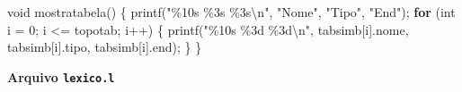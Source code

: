 \documentclass[
  brazilian,
  letterpaper,
]{book}
\newenvironment{Shaded}{\begin{snugshade}}{\end{snugshade}}
\newcommand{\ControlFlowTok}[1]{\textcolor[rgb]{0.00,0.23,0.31}{\textbf{#1}}}
\newcommand{\DataTypeTok}[1]{\textcolor[rgb]{0.68,0.00,0.00}{#1}}
\newcommand{\DecValTok}[1]{\textcolor[rgb]{0.68,0.00,0.00}{#1}}
\newcommand{\NormalTok}[1]{\textcolor[rgb]{0.00,0.23,0.31}{#1}}
\newcommand{\OperatorTok}[1]{\textcolor[rgb]{0.37,0.37,0.37}{#1}}
\newcommand{\SpecialCharTok}[1]{\textcolor[rgb]{0.37,0.37,0.37}{#1}}
\newcommand{\StringTok}[1]{\textcolor[rgb]{0.13,0.47,0.30}{#1}}
\theoremstyle{plain}
\theoremstyle{definition}
\theoremstyle{remark}
\begin{document}
\begin{Shaded}
\begin{Highlighting}[]
\DataTypeTok{void}\NormalTok{ mostratabela}\OperatorTok{()}
\OperatorTok{\{}
\NormalTok{    printf}\OperatorTok{(}\StringTok{"}\SpecialCharTok{\%10s}\StringTok{ }\SpecialCharTok{\%3s}\StringTok{ }\SpecialCharTok{\%3s\textbackslash{}n}\StringTok{"}\OperatorTok{,} \StringTok{"Nome"}\OperatorTok{,} \StringTok{"Tipo"}\OperatorTok{,} \StringTok{"End"}\OperatorTok{);}
    \ControlFlowTok{for} \OperatorTok{(}\DataTypeTok{int}\NormalTok{ i }\OperatorTok{=} \DecValTok{0}\OperatorTok{;}\NormalTok{ i }\OperatorTok{\textless{}=}\NormalTok{ topotab}\OperatorTok{;}\NormalTok{ i}\OperatorTok{++)}
    \OperatorTok{\{}
\NormalTok{        printf}\OperatorTok{(}\StringTok{"}\SpecialCharTok{\%10s}\StringTok{ }\SpecialCharTok{\%3d}\StringTok{ }\SpecialCharTok{\%3d\textbackslash{}n}\StringTok{"}\OperatorTok{,} 
\NormalTok{             tabsimb}\OperatorTok{[}\NormalTok{i}\OperatorTok{].}\NormalTok{nome}\OperatorTok{,}\NormalTok{ tabsimb}\OperatorTok{[}\NormalTok{i}\OperatorTok{].}\NormalTok{tipo}\OperatorTok{,}\NormalTok{ tabsimb}\OperatorTok{[}\NormalTok{i}\OperatorTok{].}\NormalTok{end}\OperatorTok{);}
    \OperatorTok{\}}
\OperatorTok{\}}
\end{Highlighting}
\end{Shaded}

\textbf{Arquivo \texttt{lexico.l}}
\end{document}
